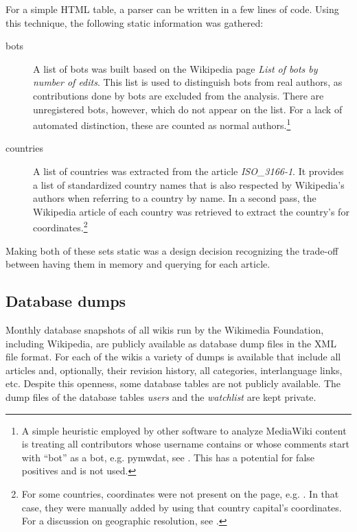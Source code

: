 For a simple \ac{HTML} table, a parser can be written in a few lines of code.
Using this technique, the following static information was gathered:

\begin{description}
\item[bots] A list of bots was built based on the Wikipedia page \emph{List of bots by number of edits}. 
This list is used to distinguish bots from real authors, as contributions done by bots are excluded from the analysis.
There are unregistered bots, however, which do not appear on the list.
For a lack of automated distinction, these are counted as normal authors.\footnote{A simple heuristic employed by other software to analyze MediaWiki content is treating all contributors whose username contains or whose comments start with ``bot'' as a bot, e.g. pymwdat, see . This has a potential for false positives and is not used.}
\item[countries] A list of countries was extracted from the article \emph{ISO\_3166-1}. 
It provides a list of standardized country names that is also respected by Wikipedia's authors when referring to a country by name.
In a second pass, the Wikipedia article of each country was retrieved to extract the country's for coordinates.\footnote{For some countries, coordinates were not present on the page, e.g. . In that case, they were manually added by using that country capital's coordinates. For a discussion on geographic resolution, see .}
\end{description}

Making both of these sets static was a design decision recognizing the trade-off between having them in memory and querying for each article.

\subsection{Database dumps}\label{sub:dumps}

Monthly database snapshots of all wikis run by the Wikimedia Foundation, including Wikipedia,  are publicly available as database dump files in the \ac{XML} file format.
For each of the wikis a variety of dumps is available that include all articles and, optionally, their revision history, all categories, interlanguage links, etc.
Despite this openness, some database tables are not publicly available.
The dump files of the database tables \emph{users} and the \emph{watchlist} are kept private.

